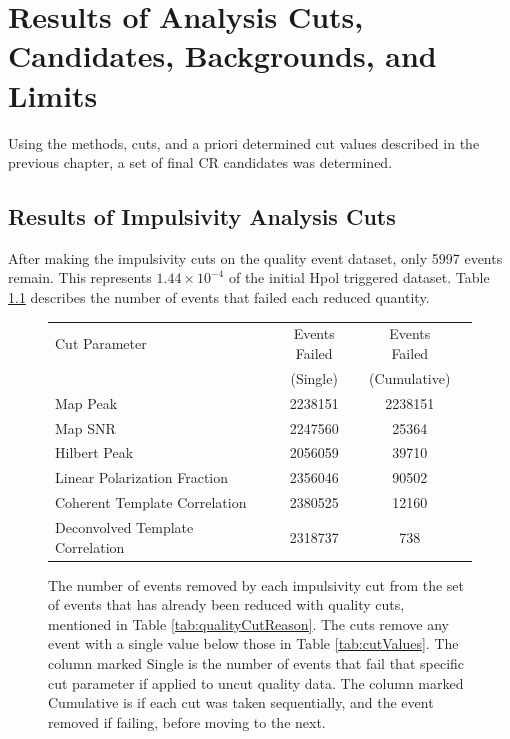 			
\chapter{Results of Analysis Cuts, Candidates, Backgrounds, and Limits}
	Using the methods, cuts, and a priori determined cut values described in the previous chapter, a set of final CR candidates was determined.

\section{Results of Impulsivity Analysis Cuts}
		After making the impulsivity cuts on the quality event dataset, only 5997 events remain.  This represents $1.44\times10^{-4}$ of the initial Hpol triggered dataset.  Table \ref{tab:weakCutReason} describes the number of events that failed each reduced quantity.
		
		\begin{figure}
		\centering
		\begin{tabular}[c]{|l|c|c|c|}
		\hline
		Cut Parameter & Events Failed & Events Failed \\
		 & (Single) &  (Cumulative) \\
		\hline
		Map Peak & 2238151 & 2238151 \\
		Map SNR & 2247560 & 25364    \\
		Hilbert Peak & 2056059 & 39710    \\
		Linear Polarization Fraction & 2356046 & 90502   \\
		Coherent Template Correlation & 2380525	& 12160    \\
		Deconvolved Template Correlation & 2318737 & 738	   \\
		\hline
		\end{tabular}
		\caption{The number of events removed by each impulsivity cut from the set of events that has already been reduced with quality cuts, mentioned in Table \ref{tab:qualityCutReason}.  The cuts remove any event with a single value below those in Table \ref{tab:cutValues}.  The column marked Single is the number of events that fail that specific cut parameter if applied to uncut quality data.  The column marked Cumulative is if each cut was taken sequentially, and the event removed if failing, before moving to the next.}
		\label{tab:weakCutReason}
		\end{figure}
		

	
